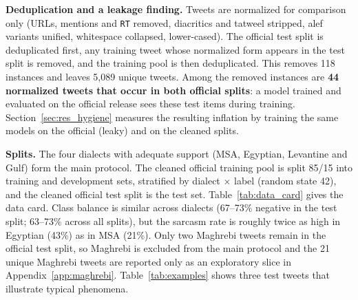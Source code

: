 \documentclass[11pt]{article}
\begin{document}
\textbf{Deduplication and a leakage finding.} Tweets are normalized for comparison only (URLs, mentions and \texttt{RT} removed, diacritics and tatweel stripped, alef variants unified, whitespace collapsed, lower-cased). The official test split is deduplicated first, any training tweet whose normalized form appears in the test split is removed, and the training pool is then deduplicated. This removes 118 instances and leaves 5,089 unique tweets. Among the removed instances are \textbf{44 normalized tweets that occur in both official splits}: a model trained and evaluated on the official release sees these test items during training. Section~\ref{sec:res_hygiene} measures the resulting inflation by training the same models on the official (leaky) and on the cleaned splits.

\textbf{Splits.} The four dialects with adequate support (MSA, Egyptian, Levantine and Gulf) form the main protocol. The cleaned official training pool is split 85/15 into training and development sets, stratified by dialect $\times$ label (random state 42), and the cleaned official test split is the test set. Table~\ref{tab:data_card} gives the data card. Class balance is similar across dialects (67--73\% negative in the test split; 63--73\% across all splits), but the sarcasm rate is roughly twice as high in Egyptian (43\%) as in MSA (21\%). Only two Maghrebi tweets remain in the official test split, so Maghrebi is excluded from the main protocol and the 21 unique Maghrebi tweets are reported only as an exploratory slice in Appendix~\ref{app:maghrebi}. Table~\ref{tab:examples} shows three test tweets that illustrate typical phenomena.

\begin{table}[tbp]
\caption{Data card of the leak-free ArSarcasm protocol (binary sentiment). Neg.\% and Sarc.\% refer to the test split.}
\label{tab:data_card}
\centering
\small
{}
\end{table}
\end{document}
